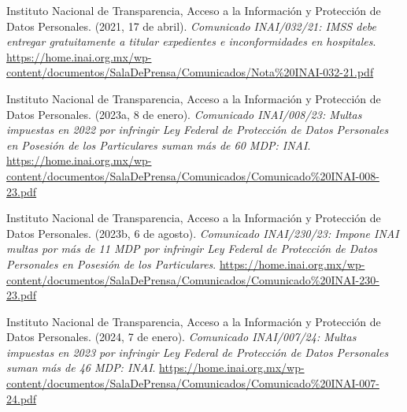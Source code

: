 \documentclass[12pt, a4paper]{article}
\begin{document}
\begin{list}{}{\setlength{\leftmargin}{1.27cm}\setlength{\itemindent}{-1.27cm}%
  \setlength{\labelwidth}{0pt}\setlength{\labelsep}{0pt}\setlength{\itemsep}{6pt}}
\item Instituto Nacional de Transparencia, Acceso a la Información
  y Protección de Datos Personales. (2021, 17 de abril).
  \textit{Comunicado INAI/032/21: IMSS debe entregar gratuitamente
  a titular expedientes e inconformidades en hospitales}.
  \url{https://home.inai.org.mx/wp-content/documentos/SalaDePrensa/Comunicados/Nota%20INAI-032-21.pdf}


\item Instituto Nacional de Transparencia, Acceso a la Información
  y Protección de Datos Personales. (2023a, 8 de enero).
  \textit{Comunicado INAI/008/23: Multas impuestas en 2022 por
  infringir Ley Federal de Protección de Datos Personales en Posesión
  de los Particulares suman más de 60 MDP: INAI}.
  \url{https://home.inai.org.mx/wp-content/documentos/SalaDePrensa/Comunicados/Comunicado%20INAI-008-23.pdf}


\item Instituto Nacional de Transparencia, Acceso a la Información
  y Protección de Datos Personales. (2023b, 6 de agosto).
  \textit{Comunicado INAI/230/23: Impone INAI multas por más de
  11 MDP por infringir Ley Federal de Protección de Datos Personales
  en Posesión de los Particulares}.
  \url{https://home.inai.org.mx/wp-content/documentos/SalaDePrensa/Comunicados/Comunicado%20INAI-230-23.pdf}


\item Instituto Nacional de Transparencia, Acceso a la Información
  y Protección de Datos Personales. (2024, 7 de enero).
  \textit{Comunicado INAI/007/24: Multas impuestas en 2023 por
  infringir Ley Federal de Protección de Datos Personales suman más
  de 46 MDP: INAI}.
  \url{https://home.inai.org.mx/wp-content/documentos/SalaDePrensa/Comunicados/Comunicado%20INAI-007-24.pdf}
 

\end{list}
\end{document}

